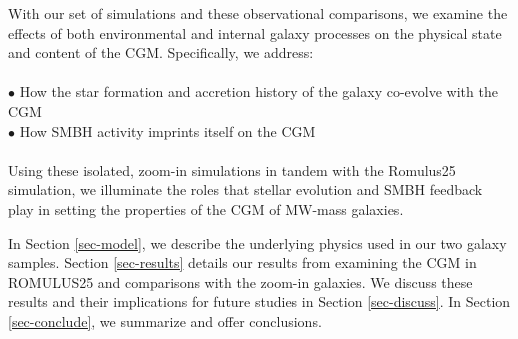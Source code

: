 \documentclass[]{emulateapj}
\begin{document}
With our set of simulations and these observational comparisons, we examine the effects of both environmental and internal galaxy processes on the physical state and content of the CGM. Specifically, we address:\\
\\
$\bullet$ How the star formation and accretion history of the galaxy co-evolve with the CGM \\
$\bullet$ How SMBH activity imprints itself on the CGM \\
\\
Using these isolated, zoom-in simulations in tandem with the {\sc Romulus25}  simulation, we illuminate the roles that stellar evolution and SMBH feedback play in setting the properties of the CGM of MW-mass galaxies.

In Section \ref{sec-model}, we describe the underlying physics used in our two galaxy samples. Section \ref{sec-results} details our results from examining the CGM in ROMULUS25 and comparisons with the zoom-in galaxies. We discuss these results and their implications for future studies in Section \ref{sec-discuss}. In Section \ref{sec-conclude}, we summarize and offer conclusions. 






\end{document}
